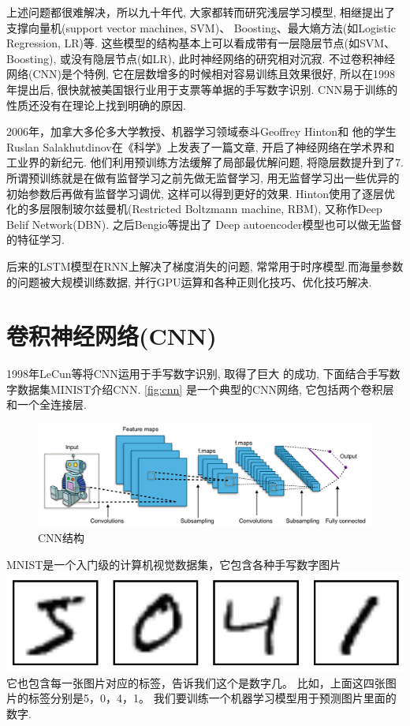 \documentclass{ctexart}
\begin{document}
上述问题都很难解决，所以九十年代, 大家都转而研究浅层学习模型,
相继提出了支撑向量机(support vector machines, SVM)、
Boosting、最大熵方法(如Logistic Regression, LR)等.
这些模型的结构基本上可以看成带有一层隐层节点(如SVM、Boosting),
或没有隐层节点(如LR), 此时神经网络的研究相对沉寂.
不过卷积神经网络(CNN)是个特例, 它在层数增多的时候相对容易训练且效果很好,
所以在1998年提出后, 很快就被美国银行业用于支票等单据的手写数字识别.
CNN易于训练的性质还没有在理论上找到明确的原因.

2006年，加拿大多伦多大学教授、机器学习领域泰斗Geoffrey Hinton和
他的学生Ruslan Salakhutdinov在《科学》上发表了一篇文章\cite{hinton2006reducing},
开启了神经网络在学术界和工业界的新纪元.
他们利用预训练方法缓解了局部最优解问题, 将隐层数提升到了7.
所谓预训练就是在做有监督学习之前先做无监督学习, 用无监督学习出一些优异的
初始参数后再做有监督学习调优, 这样可以得到更好的效果.
Hinton使用了逐层优化的多层限制玻尔兹曼机(Restricted Boltzmann machine, RBM),
又称作Deep Belif Network(DBN). 之后Bengio等\cite{bengio2007greedy}提出了
Deep autoencoder模型也可以做无监督的特征学习.

后来的LSTM模型在RNN上解决了梯度消失的问题, 常常用于时序模型.而海量参数
的问题被大规模训练数据, 并行GPU运算和各种正则化技巧、优化技巧解决.

\section{卷积神经网络(CNN)}
1998年LeCun等\cite{lecun1998gradient}将CNN运用于手写数字识别, 取得了巨大
的成功, 下面结合手写数字数据集MINIST介绍CNN. \autoref{fig:cnn}
是一个典型的CNN网络, 它包括两个卷积层和一个全连接层.
\begin{figure}[htb]
  \centering
  \includegraphics[width=.9\textwidth]{Typical_cnn}
  \caption{CNN结构}
  \label{fig:cnn}
\end{figure}

MNIST是一个入门级的计算机视觉数据集，它包含各种手写数字图片\\
{\centering
  \includegraphics[width=.7\textwidth]{minist}\\
}
它也包含每一张图片对应的标签，告诉我们这个是数字几。
比如，上面这四张图片的标签分别是5，0，4，1。
我们要训练一个机器学习模型用于预测图片里面的数字.
\end{document}
